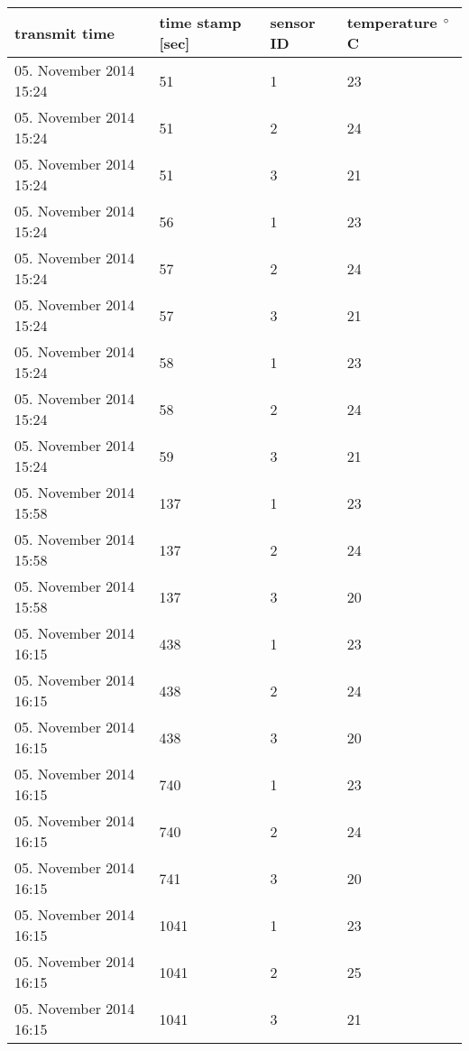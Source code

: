 \begin{table}[H]
	\begin{tabular}
		{| p{6cm} |  p{4cm} | p{2cm} | p{3cm}  |}
		\hline
		transmit time & time stamp [sec] & sensor ID & temperature $\degree$C  \\ \hline
		05. November 2014 15:24 & 51   & 1 & 23 \\  \hline
		05. November 2014 15:24 & 51   & 2 & 24 \\  \hline
		05. November 2014 15:24 & 51   & 3 & 21 \\  \hline
		05. November 2014 15:24 & 56   & 1 & 23 \\  \hline
	    05. November 2014 15:24 & 57   & 2 & 24 \\  \hline
		05. November 2014 15:24 & 57   & 3 & 21 \\  \hline
		05. November 2014 15:24 & 58   & 1 & 23 \\  \hline
		05. November 2014 15:24 & 58   & 2 & 24 \\  \hline
		05. November 2014 15:24 & 59   & 3 & 21 \\  \hline
		05. November 2014 15:58 & 137  & 1 & 23 \\  \hline
		05. November 2014 15:58 & 137  & 2 & 24 \\  \hline
		05. November 2014 15:58 & 137  & 3 & 20 \\  \hline
		05. November 2014 16:15 & 438  & 1 & 23 \\  \hline
		05. November 2014 16:15 & 438  & 2 & 24 \\  \hline
		05. November 2014 16:15 & 438  & 3 & 20 \\  \hline
		05. November 2014 16:15 & 740  & 1 & 23 \\  \hline
		05. November 2014 16:15 & 740  & 2 & 24 \\  \hline
		05. November 2014 16:15 & 741  & 3 & 20 \\  \hline
		05. November 2014 16:15 & 1041 & 1 & 23 \\  \hline
		05. November 2014 16:15 & 1041 & 2 & 25 \\  \hline
		05. November 2014 16:15 & 1041 & 3 & 21 \\  \hline
		
		
		
	\end{tabular}
\end{table}

